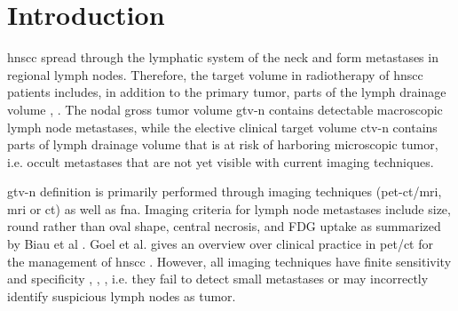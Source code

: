 \documentclass[\relativeRoot/main.tex]{subfiles}
\begin{document}
\section{Introduction}
\label{sec:dataset:introduction}

\Gls{hnscc} spread through the lymphatic system of the neck and form metastases in regional lymph nodes. Therefore, the target volume in radiotherapy of \gls{hnscc} patients includes, in addition to the primary tumor, parts of the lymph drainage volume \cite{biau_selection_2019}, \cite{grosu_target_2015}. The nodal gross tumor volume \gls{gtv-n} contains detectable macroscopic lymph node metastases, while the elective clinical target volume \gls{ctv-n} contains parts of lymph drainage volume that is at risk of harboring microscopic tumor, i.e. occult metastases that are not yet visible with current imaging techniques.

\Gls{gtv-n} definition is primarily performed through imaging techniques (\gls{pet}-\gls{ct}/\gls{mri}, \gls{mri} or \gls{ct}) as well as \gls{fna}. Imaging criteria for lymph node metastases include size, round rather than oval shape, central necrosis, and FDG uptake as summarized by Biau et al \cite{biau_selection_2019}. Goel et al. gives an overview over clinical practice in \gls{pet}/\gls{ct} for the management of \gls{hnscc} \cite{goel_clinical_2017}. However, all imaging techniques have finite sensitivity and specificity \cite{park_diagnostic_2020}, \cite{jensen_imaging_2021}, \cite{rohde_18f-fluoro-deoxy-glucose-positron_2014}, i.e. they fail to detect small metastases or may incorrectly identify suspicious lymph nodes as tumor.
\end{document}
